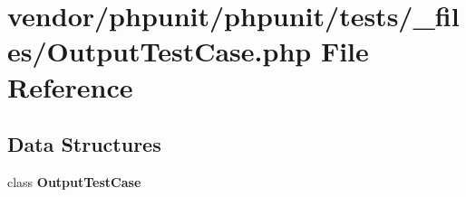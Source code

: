 \section{vendor/phpunit/phpunit/tests/\+\_\+files/\+Output\+Test\+Case.php File Reference}
\label{_output_test_case_8php}
\subsection*{Data Structures}
\begin{DoxyCompactItemize}
\item 
class {\bf Output\+Test\+Case}
\end{DoxyCompactItemize}
